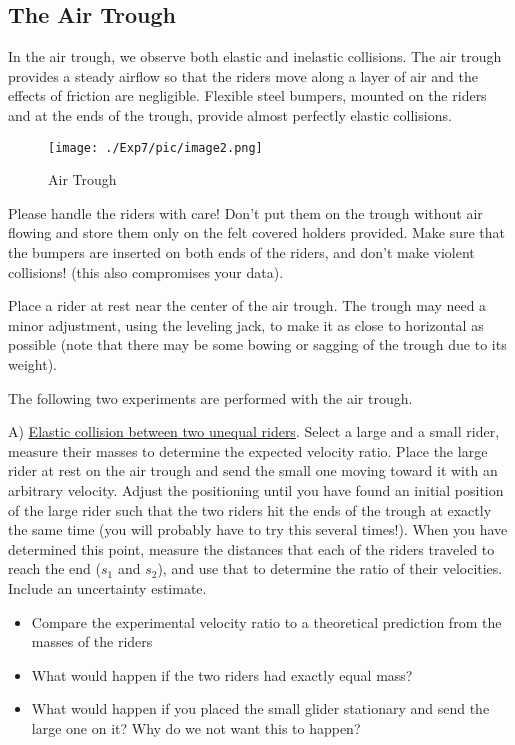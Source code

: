 \subsection{The Air Trough}
In the air trough, we observe both elastic and inelastic collisions. The air trough provides a steady airflow so that the riders move along a layer of air and the effects of friction are negligible. Flexible steel bumpers, mounted on the riders and at the ends of the trough, provide almost perfectly elastic collisions.\myskip
\begin{figure}[h]
\centering
\texttt{[image: ./Exp7/pic/image2.png]}
\caption{Air Trough}
\end{figure} 

Please handle the riders with care! Don’t put them on the trough without air flowing and store them only on the felt covered holders provided. Make sure that the bumpers are inserted on both ends of the riders, and don't make violent collisions! (this also compromises your data).\myskip

Place a rider at rest near the center of the air trough. The trough may need a minor adjustment, using the leveling jack, to make it as close to horizontal as possible (note that there may be some bowing or sagging of the trough due to its weight).\myskip

The following two experiments are performed with the air trough.\myskip

A) \underline{Elastic collision between two unequal riders}. Select a large and a small rider, measure their masses to determine the expected velocity ratio. Place the large rider at rest on the air trough and send the small one moving toward it with an arbitrary velocity. Adjust the positioning until you have found an initial position of the large rider such that the two riders hit the ends of the trough at exactly the same time (you will probably have to try this several times!). When you have determined this point, measure the distances that each of the riders traveled to reach the end ($s_{1}$ and $s_{2}$), and use that to determine the ratio of their velocities. Include an uncertainty estimate.
\begin{itemize}
\item Compare the experimental velocity ratio to a theoretical prediction from the masses of the riders
\item What would happen if the two riders had exactly equal mass?
\item What would happen if you placed the small glider stationary and send the large one on it? Why do we not want this to happen?
\end{itemize}

